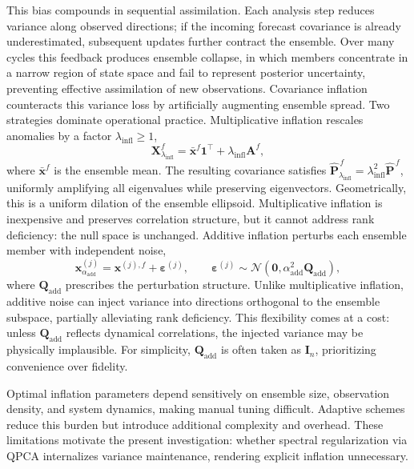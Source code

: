 \documentclass[11pt,a4paper]{article}
\begin{document}
This bias compounds in sequential assimilation. Each analysis step reduces variance along observed directions; if the incoming forecast covariance is already underestimated, subsequent updates further contract the ensemble. Over many cycles this feedback produces ensemble collapse, in which members concentrate in a narrow region of state space and fail to represent posterior uncertainty, preventing effective assimilation of new observations. Covariance inflation counteracts this variance loss by artificially augmenting ensemble spread. Two strategies dominate operational practice. Multiplicative inflation rescales anomalies by a factor $\lambda_{\mathrm{infl}} \ge 1$,
\begin{equation}
\mathbf{X}^f_{\lambda_{\mathrm{infl}}}
=
\bar{\mathbf{x}}^f\mathbf{1}^{\top}
+
\lambda_{\mathrm{infl}} \mathbf{A}^f,
\end{equation}
where $\bar{\mathbf{x}}^f$ is the ensemble mean. The resulting covariance satisfies
$\widehat{\mathbf{P}}^{\,f}_{\lambda_{\mathrm{infl}}}=\lambda_{\mathrm{infl}}^2\widehat{\mathbf{P}}^{\,f}$,
uniformly amplifying all eigenvalues while preserving eigenvectors. Geometrically, this is a uniform dilation of the ensemble ellipsoid. Multiplicative inflation is inexpensive and preserves correlation structure, but it cannot address rank deficiency: the null space is unchanged. Additive inflation perturbs each ensemble member with independent noise,
\begin{equation}
\mathbf{x}^{(j)}_{\alpha_{\mathrm{add}}}
=
\mathbf{x}^{(j),f}+\boldsymbol{\varepsilon}^{(j)},
\qquad
\boldsymbol{\varepsilon}^{(j)}\sim\mathcal{N}(\mathbf{0},\alpha_{\mathrm{add}}^2\mathbf{Q}_{\mathrm{add}}),
\end{equation}
where $\mathbf{Q}_{\mathrm{add}}$ prescribes the perturbation structure. Unlike multiplicative inflation, additive noise can inject variance into directions orthogonal to the ensemble subspace, partially alleviating rank deficiency. This flexibility comes at a cost: unless $\mathbf{Q}_{\mathrm{add}}$ reflects dynamical correlations, the injected variance may be physically implausible. For simplicity, $\mathbf{Q}_{\mathrm{add}}$ is often taken as $\mathbf{I}_n$, prioritizing convenience over fidelity.

Optimal inflation parameters depend sensitively on ensemble size, observation density, and system dynamics, making manual tuning difficult. Adaptive schemes reduce this burden but introduce additional complexity and overhead. These limitations motivate the present investigation: whether spectral regularization via QPCA internalizes variance maintenance, rendering explicit inflation unnecessary.
\end{document}
